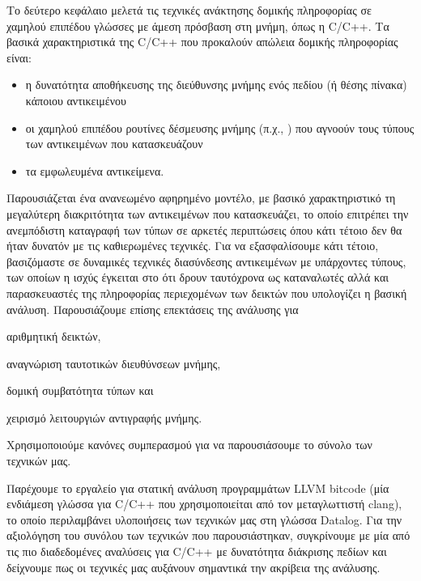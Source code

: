Το δεύτερο κεφάλαιο μελετά τις τεχνικές ανάκτησης δομικής πληροφορίας
σε χαμηλού επιπέδου γλώσσες με άμεση πρόσβαση στη μνήμη, όπως η {\en
  C/C++}.
%
Τα βασικά χαρακτηριστικά της {\en C/C++} που προκαλούν απώλεια δομικής
πληροφορίας είναι:
\begin{itemize}[--]
\item η δυνατότητα αποθήκευσης της διεύθυνσης μνήμης ενός πεδίου (ή
  θέσης πίνακα) κάποιου αντικειμένου
\item οι χαμηλού επιπέδου ρουτίνες δέσμευσης μνήμης (π.χ., {\en
    }) που αγνοούν τους τύπους των αντικειμένων που
  κατασκευάζουν
\item τα εμφωλευμένα αντικείμενα.
\end{itemize}
%
Παρουσιάζεται ένα ανανεωμένο αφηρημένο μοντέλο, με βασικό
χαρακτηριστικό τη μεγαλύτερη διακριτότητα των αντικειμένων που
κατασκευάζει, το οποίο επιτρέπει την ανεμπόδιστη καταγραφή των τύπων
σε αρκετές περιπτώσεις όπου κάτι τέτοιο δεν θα ήταν δυνατόν με τις
καθιερωμένες τεχνικές.  Για να εξασφαλίσουμε κάτι τέτοιο, βασιζόμαστε
σε δυναμικές τεχνικές διασύνδεσης αντικειμένων με υπάρχοντες τύπους,
των οποίων η ισχύς έγκειται στο ότι δρουν ταυτόχρονα ως καταναλωτές
αλλά και παρασκευαστές της πληροφορίας περιεχομένων των δεικτών που
υπολογίζει η βασική ανάλυση. Παρουσιάζουμε επίσης επεκτάσεις της
ανάλυσης για
\begin{inparaenum}[(1)]
\item αριθμητική δεικτών,
\item αναγνώριση ταυτοτικών διευθύνσεων μνήμης,
\item δομική συμβατότητα τύπων και
\item χειρισμό λειτουργιών αντιγραφής μνήμης.
\end{inparaenum}
Χρησιμοποιούμε κανόνες συμπερασμού για να παρουσιάσουμε το σύνολο των
τεχνικών μας.

Παρέχουμε το εργαλείο {\en \cclyzer{}} για στατική ανάλυση
προγραμμάτων {\en LLVM bitcode} (μία ενδιάμεση γλώσσα για {\en C/C++}
που χρησιμοποιείται από τον μεταγλωττιστή {\en clang}), το οποίο
περιλαμβάνει υλοποιήσεις των τεχνικών μας στη γλώσσα {\en Datalog}.
%
Για την αξιολόγηση του συνόλου των τεχνικών που παρουσιάστηκαν,
συγκρίνουμε με μία από τις πιο διαδεδομένες αναλύσεις για {\en C/C++}
με δυνατότητα διάκρισης πεδίων
\cite{paste/PearceKH04,toplas/PearceKH07} και δείχνουμε πως οι
τεχνικές μας αυξάνουν σημαντικά την ακρίβεια της ανάλυσης.



